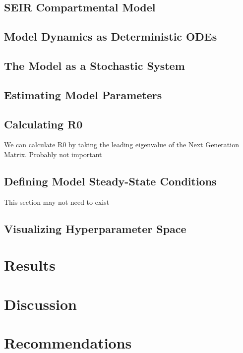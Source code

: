 \documentclass[11pt, a4paper]{article}
\begin{document}
  \subsection{SEIR Compartmental Model}
  
  \subsection{Model Dynamics as Deterministic ODEs}
  
  \subsection{The Model as a Stochastic System}
  
  \subsection{Estimating Model Parameters}
  
  \subsection{Calculating R0}
  We can calculate R0 by taking the leading eigenvalue of the Next Generation Matrix.
  Probably not important
  \clearpage
  \subsection{Defining Model Steady-State Conditions}
  This section may not need to exist
  \clearpage
  \subsection{Visualizing Hyperparameter Space}
  
\section{Results}

\section{Discussion}

\section{Recommendations}

{}

\end{document}
